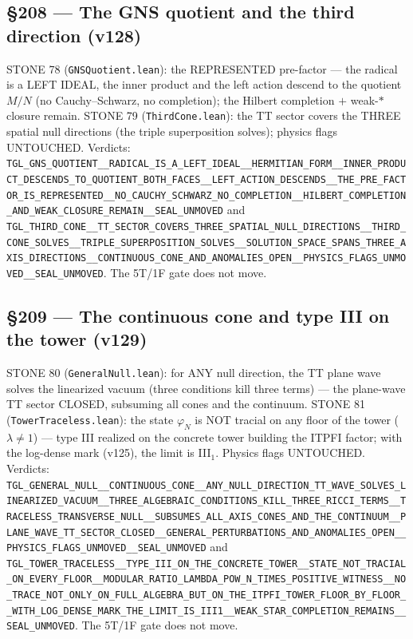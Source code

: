 \documentclass[11pt]{article}
\theoremstyle{definition}\newtheorem{deriv}{Derivation}
\begin{document}
\subsection*{\S208 --- The GNS quotient and the third direction (v128)}STONE 78 (\texttt{GNSQuotient.lean}): the REPRESENTED pre-factor — the radical is a LEFT IDEAL, the inner product and the left action descend to the quotient $M/N$ (no Cauchy--Schwarz, no completion); the Hilbert completion $+$ weak-$*$ closure remain. STONE 79 (\texttt{ThirdCone.lean}): the TT sector covers the THREE spatial null directions (the triple superposition solves); physics flags UNTOUCHED. Verdicts: \texttt{TGL\_GNS\_QUOTIENT\_\_RADICAL\_IS\_A\_LEFT\_IDEAL\_\_HERMITIAN\_FORM\_\_INNER\_PRODUCT\_DESCENDS\_TO\_QUOTIENT\_BOTH\_FACES\_\_LEFT\_ACTION\_DESCENDS\_\_THE\_PRE\_FACTOR\_IS\_REPRESENTED\_\_NO\_CAUCHY\_SCHWARZ\_NO\_COMPLETION\_\_HILBERT\_COMPLETION\_AND\_WEAK\_CLOSURE\_REMAIN\_\_SEAL\_UNMOVED} and \texttt{TGL\_THIRD\_CONE\_\_TT\_SECTOR\_COVERS\_THREE\_SPATIAL\_NULL\_DIRECTIONS\_\_THIRD\_CONE\_SOLVES\_\_TRIPLE\_SUPERPOSITION\_SOLVES\_\_SOLUTION\_SPACE\_SPANS\_THREE\_AXIS\_DIRECTIONS\_\_CONTINUOUS\_CONE\_AND\_ANOMALIES\_OPEN\_\_PHYSICS\_FLAGS\_UNMOVED\_\_SEAL\_UNMOVED}. The 5T/1F gate does not move.

\subsection*{\S209 --- The continuous cone and type III on the tower (v129)}STONE 80 (\texttt{GeneralNull.lean}): for ANY null direction, the TT plane wave solves the linearized vacuum (three conditions kill three terms) --- the plane-wave TT sector CLOSED, subsuming all cones and the continuum. STONE 81 (\texttt{TowerTraceless.lean}): the state $\varphi_N$ is NOT tracial on any floor of the tower ($\lambda\neq1$) --- type III realized on the concrete tower building the ITPFI factor; with the log-dense mark (v125), the limit is III$_1$. Physics flags UNTOUCHED. Verdicts: \texttt{TGL\_GENERAL\_NULL\_\_CONTINUOUS\_CONE\_\_ANY\_NULL\_DIRECTION\_TT\_WAVE\_SOLVES\_LINEARIZED\_VACUUM\_\_THREE\_ALGEBRAIC\_CONDITIONS\_KILL\_THREE\_RICCI\_TERMS\_\_TRACELESS\_TRANSVERSE\_NULL\_\_SUBSUMES\_ALL\_AXIS\_CONES\_AND\_THE\_CONTINUUM\_\_PLANE\_WAVE\_TT\_SECTOR\_CLOSED\_\_GENERAL\_PERTURBATIONS\_AND\_ANOMALIES\_OPEN\_\_PHYSICS\_FLAGS\_UNMOVED\_\_SEAL\_UNMOVED} and \texttt{TGL\_TOWER\_TRACELESS\_\_TYPE\_III\_ON\_THE\_CONCRETE\_TOWER\_\_STATE\_NOT\_TRACIAL\_ON\_EVERY\_FLOOR\_\_MODULAR\_RATIO\_LAMBDA\_POW\_N\_TIMES\_POSITIVE\_WITNESS\_\_NO\_TRACE\_NOT\_ONLY\_ON\_FULL\_ALGEBRA\_BUT\_ON\_THE\_ITPFI\_TOWER\_FLOOR\_BY\_FLOOR\_\_WITH\_LOG\_DENSE\_MARK\_THE\_LIMIT\_IS\_III1\_\_WEAK\_STAR\_COMPLETION\_REMAINS\_\_SEAL\_UNMOVED}. The 5T/1F gate does not move.
\end{document}

